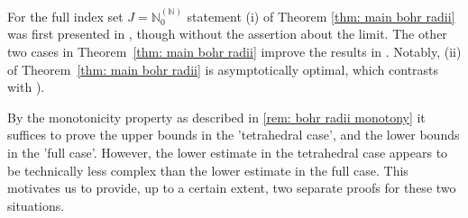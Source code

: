 \documentclass[12pt]{amsart}
\numberwithin{subsection}{section}
\theoremstyle{definition}
\theoremstyle{remark}
\def\N{\mathbb{ N}}
\begin{document}
For the full index set $J= \N_{0}^{(\N)}$ statement (i)  of Theorem \ref{thm: main bohr radii} was first presented in  \cite[Corollary 10, (i)]{defant2018bohr},
though without the assertion about the limit. The other two cases in Theorem~\ref{thm: main bohr radii} improve the results in  \cite[Corollary 10, (ii) and (iii)]{defant2018bohr}.
Notably, (ii) of Theorem~\ref{thm: main bohr radii} is asymptotically optimal, which contrasts with \cite[Corollary 10, (ii)]{defant2018bohr}).

By the monotonicity property as described in  \eqref{rem: bohr radii monotony} it suffices to prove the upper bounds  in the 'tetrahedral case',
and the lower bounds
in the  'full case'. However, the lower estimate in the tetrahedral case appears to be technically less complex than the lower estimate in the full case. This motivates us
to provide, up to a certain extent, two separate proofs for these two situations.
\end{document}
